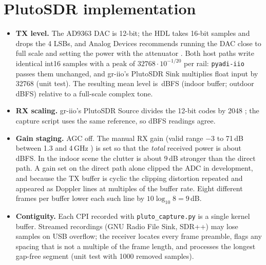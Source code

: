 \documentclass[10pt,a4paper]{article}
\newcommand{\code}[1]{\texttt{#1}}
\begin{document}
\section{PlutoSDR implementation}\label{sec:impl}
\begin{itemize}
\item \textbf{TX level.} The AD9363 DAC is 12-bit; the HDL takes 16-bit samples and drops the 4 LSBs, and Analog
Devices recommends running the DAC close to full scale and setting the power with the attenuator \cite{adiTx}.
Both host paths write identical int16 samples with a peak of $32768\cdot10^{-1/20}$ per rail: \code{pyadi-iio}
passes them unchanged, and gr-iio's PlutoSDR Sink multiplies float input by 32768 \cite{griio} (unit test).
The resulting mean level is \RmsI\,dBFS (indoor buffer; outdoor \RmsO\,dBFS) relative to a full-scale complex tone.
\item \textbf{RX scaling.} gr-iio's PlutoSDR Source divides the 12-bit codes by 2048 \cite{griio}; the capture
script uses the same reference, so dBFS readings agree.
\item \textbf{Gain staging.} AGC off. The manual RX gain (valid range $-3$ to 71\,dB between 1.3 and 4\,GHz
\cite{mathworksPluto}) is set so that the \emph{total} received power is about \LvlI\,dBFS. In the indoor scene the
clutter is about 9\,dB stronger than the direct path. A gain set on the direct path alone clipped the ADC in
development, and because the TX buffer is cyclic the clipping distortion repeated and appeared as Doppler lines
at multiples of the buffer rate. Eight different frames per buffer lower each such line by $10\log_{10}8=9$\,dB.
\item \textbf{Contiguity.} Each CPI recorded with \code{pluto\_capture.py} is a single kernel buffer. Streamed
recordings (GNU Radio File Sink, SDR++) may lose samples on USB overflow; the receiver locates every frame
preamble, flags any spacing that is not a multiple of the frame length, and processes the longest gap-free
segment (unit test with 1000 removed samples).
\end{itemize}
\end{document}
